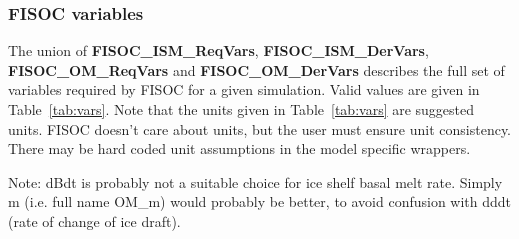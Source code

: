 \documentclass[12pt]{article}
\begin{document}
\subsubsection{FISOC variables}
\label{sec:FISOCvars}

The union of \textbf{FISOC\_ISM\_ReqVars}, \textbf{FISOC\_ISM\_DerVars}, \textbf{FISOC\_OM\_ReqVars} 
and \textbf{FISOC\_OM\_DerVars} describes the full set of variables required by FISOC for a given simulation. 
Valid values are given in Table~\ref{tab:vars}.
Note that the units given in Table~\ref{tab:vars} are suggested units.  FISOC doesn't care about units, but 
the user must ensure unit consistency.  There may be hard coded unit assumptions in the model specific 
wrappers.

Note: dBdt is probably not a suitable choice for ice shelf basal melt rate.  
Simply m (i.e. full name OM\_m) would probably be better, to avoid confusion with dddt 
(rate of change of ice draft).
\end{document}
